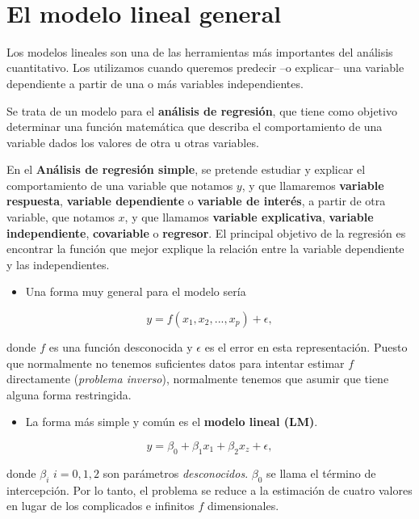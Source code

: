 \documentclass[]{book}
\providecommand{\tightlist}{%
  \setlength{\itemsep}{0pt}\setlength{\parskip}{0pt}}
\begin{document}
~

\section{El modelo lineal general}\label{el-modelo-lineal-general}

Los modelos lineales son una de las herramientas más importantes del
análisis cuantitativo. Los utilizamos cuando queremos predecir --o
explicar-- una variable dependiente a partir de una o más variables
independientes.

Se trata de un modelo para el \textbf{análisis de regresión}, que tiene
como objetivo determinar una función matemática que describa el
comportamiento de una variable dados los valores de otra u otras
variables.

En el \textbf{Análisis de regresión simple}, se pretende estudiar y
explicar el comportamiento de una variable que notamos \(y\), y que
llamaremos \textbf{variable respuesta}, \textbf{variable dependiente} o
\textbf{variable de interés}, a partir de otra variable, que notamos
\(x\), y que llamamos \textbf{variable explicativa}, \textbf{variable
independiente}, \textbf{covariable} o \textbf{regresor}. El principal
objetivo de la regresión es encontrar la función que mejor explique la
relación entre la variable dependiente y las independientes.

\begin{itemize}
\tightlist
\item
  Una forma muy general para el modelo sería
\end{itemize}

\[
      y = f(x_1,x_2,...,x_p) + \epsilon,
\]

donde \(f\) es una función desconocida y \(\epsilon\) es el error en
esta representación. Puesto que normalmente no tenemos suficientes datos
para intentar estimar \(f\) directamente (\emph{problema inverso}),
normalmente tenemos que asumir que tiene alguna forma restringida.

\begin{itemize}
\tightlist
\item
  La forma más simple y común es el \textbf{modelo lineal (LM)}.
\end{itemize}

\[
    y = \beta_0 + \beta_1 x_1 + \beta_2 x_z + \epsilon,
\]

donde \(\beta_i\) \(i=0,1,2\) son parámetros \emph{desconocidos}.
\(\beta_0\) se llama el término de intercepción. Por lo tanto, el
problema se reduce a la estimación de cuatro valores en lugar de los
complicados e infinitos \(f\) dimensionales.
\end{document}
